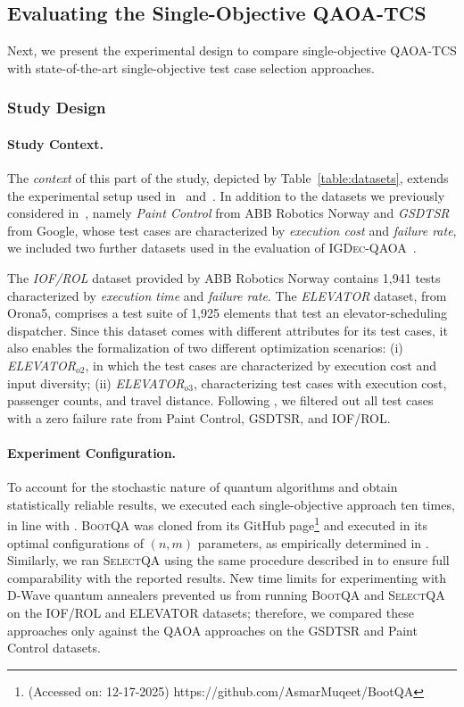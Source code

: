 \subsection{Evaluating the Single-Objective QAOA-TCS}
\label{sec:4.3}
Next, we present the experimental design to compare single-objective QAOA-TCS with state-of-the-art single-objective test case selection approaches.

\subsubsection{Study Design}
\label{sec:4.3.1}

\paragraph{Study Context.}
The \textit{context} of this part of the study, depicted by Table~\ref{table:datasets}, extends the experimental setup used in~\citep{selectqa} and~\citep{bootqa}. In addition to the datasets we previously considered in~\citep{selectqa}, namely \textit{Paint Control} from ABB Robotics Norway and \textit{GSDTSR} from Google, whose test cases are characterized by \emph{execution cost} and \emph{failure rate}, we included two further datasets used in the evaluation of \textsc{IGDec-QAOA}~\citep{igdec_qaoa}.  

The \textit{IOF/ROL} dataset provided by ABB Robotics Norway contains 1,941 tests characterized by \textit{execution time} and \textit{failure rate}.
The \textit{ELEVATOR} dataset, from Orona5, comprises a test suite of 1,925 elements that test an elevator-scheduling dispatcher. Since this dataset comes with different attributes for its test cases, it also enables the formalization of two different optimization scenarios: (i) \textit{ELEVATOR$_{o2}$}, in which the test cases are characterized by execution cost and input diversity; (ii) \textit{ELEVATOR$_{o3}$}, characterizing test cases with execution cost, passenger counts, and travel distance.
Following \citet{bootqa,selectqa,igdec_qaoa}, we filtered out all test cases with a zero failure rate from Paint Control, GSDTSR, and IOF/ROL.

\paragraph{Experiment Configuration.}
To account for the stochastic nature of quantum algorithms and obtain statistically reliable results, we executed each single-objective approach ten times, in line with \citet{bootqa,selectqa}.  
\textsc{BootQA} was cloned from its GitHub page\footnote{(Accessed on: 12-17-2025) https://github.com/AsmarMuqeet/BootQA} and executed in its optimal configurations of $(n,m)$ parameters, as empirically determined in \citet{bootqa}. Similarly, we ran \textsc{SelectQA} using the same procedure described in \citet{selectqa} to ensure full comparability with the reported results.  
New time limits for experimenting with D-Wave quantum annealers prevented us from running \textsc{BootQA} and \textsc{SelectQA} on the IOF/ROL and ELEVATOR datasets; therefore, we compared these approaches only against the QAOA approaches on the GSDTSR and Paint Control datasets.

